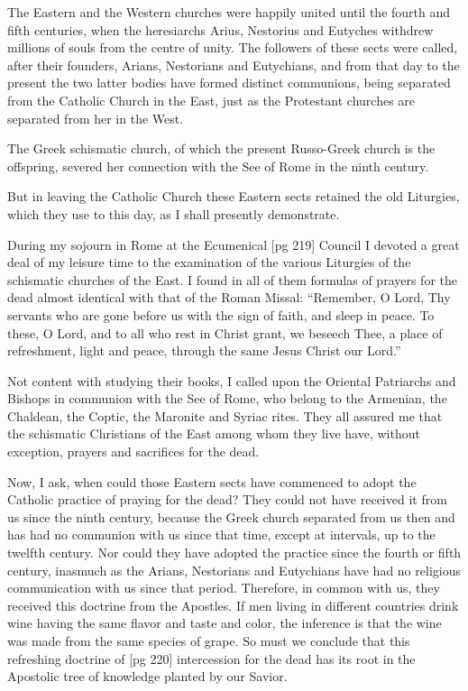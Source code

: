 The Eastern and the Western churches were
happily united until the fourth and fifth centuries,
when the heresiarchs Arius, Nestorius and Eutyches
withdrew millions of souls from the centre
of unity. The followers of these sects were called,
after their founders, Arians, Nestorians and Eutychians,
and from that day to the present the two
latter bodies have formed distinct communions,
being separated from the Catholic Church in the
East, just as the Protestant churches are separated
from her in the West.

The Greek schismatic church, of which the present
Russo-Greek church is the offspring, severed
her connection with the See of Rome in the ninth
century.

But in leaving the Catholic Church these Eastern
sects retained the old Liturgies, which they
use to this day, as I shall presently demonstrate.

During my sojourn in Rome at the Ecumenical
[pg 219]
Council I devoted a great deal of my leisure time
to the examination of the various Liturgies of the
schismatic churches of the East. I found in all
of them formulas of prayers for the dead almost
identical with that of the Roman Missal: “Remember,
O Lord, Thy servants who are gone before
us with the sign of faith, and sleep in peace.
To these, O Lord, and to all who rest in Christ
grant, we beseech Thee, a place of refreshment,
light and peace, through the same Jesus Christ
our Lord.”

Not content with studying their books, I called
upon the Oriental Patriarchs and Bishops in communion
with the See of Rome, who belong to the
Armenian, the Chaldean, the Coptic, the Maronite
and Syriac rites. They all assured me that the
schismatic Christians of the East among whom
they live have, without exception, prayers and
sacrifices for the dead.

Now, I ask, when could those Eastern sects have
commenced to adopt the Catholic practice of praying
for the dead? They could not have received
it from us since the ninth century, because the
Greek church separated from us then and has
had no communion with us since that time, except
at intervals, up to the twelfth century. Nor
could they have adopted the practice since the
fourth or fifth century, inasmuch as the Arians,
Nestorians and Eutychians have had no religious
communication with us since that period. Therefore,
in common with us, they received this doctrine
from the Apostles. If men living in different
countries drink wine having the same flavor
and taste and color, the inference is that the wine
was made from the same species of grape. So
must we conclude that this refreshing doctrine of
[pg 220]
intercession for the dead has its root in the Apostolic
tree of knowledge planted by our Savior.

